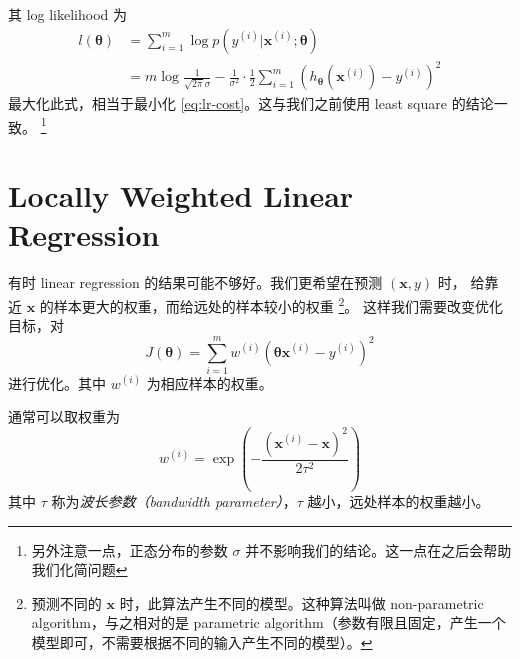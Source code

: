 		其 log likelihood 为 
		\begin{align*}
			l(\bm{\theta}) &= \sum_{i=1}^{m} \log p(y^{(i)} | \bm{x}^{(i)}; \bm{\theta}) \\
			&= m\log \frac{1}{\sqrt{2\pi}\sigma} - \frac{1}{\sigma^2} \cdot \frac{1}{2} \sum_{i=1}^{m} \left( h_{\bm{\theta}}(\bm{x}^{(i)}) - y^{(i)} \right)^2
		\end{align*}
		最大化此式，相当于最小化 \eqref{eq:lr-cost}。这与我们之前使用 least square 的结论一致。
		\footnote{另外注意一点，正态分布的参数 $ \sigma $ 并不影响我们的结论。这一点在之后会帮助我们化简问题}
		
	\section{Locally Weighted Linear Regression}
		有时 linear regression 的结果可能不够好。我们更希望在预测 $ (\bm{x}, y) $ 时，
		给靠近 $ \bm{x} $ 的样本更大的权重，而给远处的样本较小的权重
		\footnote{预测不同的 $ \bm{x} $ 时，此算法产生不同的模型。这种算法叫做 non-parametric algorithm，与之相对的是 parametric algorithm（参数有限且固定，产生一个模型即可，不需要根据不同的输入产生不同的模型）。}。
		这样我们需要改变优化目标，对 
		\begin{equation}
			J(\bm{\theta}) = \sum_{i=1}^{m} w^{(i)} (\bm{\theta}\bm{x}^{(i)} - y^{(i)})^2
		\end{equation}
		进行优化。其中 $ w^{(i)} $ 为相应样本的权重。
		
		通常可以取权重为
		\begin{equation}
			w^{(i)} = \exp \left( - \frac{ (\bm{x}^{(i)} - \bm{x})^2 }{2\tau ^2} \right)
		\end{equation}
		其中 $ \tau $ 称为\emph{波长参数（bandwidth parameter）}，$ \tau $ 越小，远处样本的权重越小。
